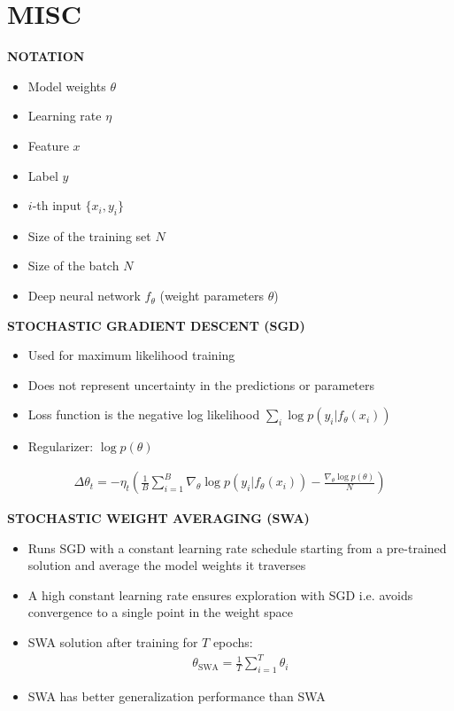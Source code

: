\section{MISC}

\begin{whitebox}{\textbf{NOTATION}}
    \begin{itemize}
        \item Model weights $\theta$
        \item Learning rate $\eta$
        \item Feature $x$
        \item Label $y$
        \item $i$-th input $\{x_i,y_i\}$
        \item Size of the training set $N$
        \item Size of the batch $N$
        \item Deep neural network $f_\theta$ (weight parameters $\theta$)
    \end{itemize}
\end{whitebox}

\begin{whitebox}{\textbf{STOCHASTIC GRADIENT DESCENT (SGD)}}
    \begin{itemize}
        \item Used for maximum likelihood training
        \item Does not represent uncertainty in the predictions or parameters
        \item Loss function is the negative log likelihood $\sum_{i}\log p(y_{i}|f_{\theta}(x_{i}))$
        \item Regularizer: $\log p(\theta)$
    \end{itemize}
    \begin{align*}
        \Delta\theta_{t}=-\eta_{t}\left(\frac{1}{B}\sum_{i=1}^{B}\nabla_{\theta}\log p(y_{i}|f_{\theta}(x_{i}))-\frac{\nabla_{\theta}\log p(\theta)}{N}\right)
    \end{align*}
\end{whitebox}

\begin{whitebox}{\textbf{STOCHASTIC WEIGHT AVERAGING (SWA)}}
    \begin{itemize}
        \item Runs SGD with a constant learning rate schedule starting from a pre-trained solution and average the model weights it traverses
        \item A high constant learning rate ensures exploration with SGD i.e. avoids convergence to a single point in the weight space
        \item SWA solution after training for $T$ epochs:
        \begin{align*}
            \theta_{\mathrm{SWA}}={\frac{1}{T}}\sum_{i=1}^{T}\theta_{i}
        \end{align*}
        \item SWA has better generalization performance than SWA
    \end{itemize}
\end{whitebox}

